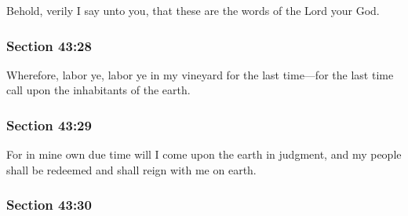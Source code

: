 		Behold, verily I say unto you, that these are the words of the Lord your God.


	\subsubsection{Section 43:28} %
		\label{DC43-28}

		Wherefore, labor ye, labor ye in my vineyard for the last time---for the last time call upon the inhabitants of the earth.


	\subsubsection{Section 43:29} %
		\label{DC43-29}

		For in mine own due time will I come upon the earth in judgment, and my people shall be redeemed and shall reign with me on earth.


	\subsubsection{Section 43:30} %
		\label{DC43-30}

